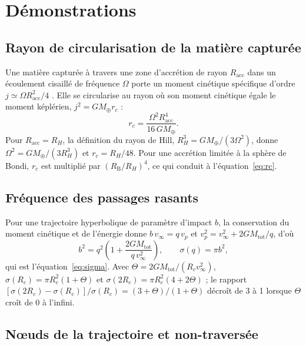 \documentclass[11pt,a4paper,openany]{report}
\newcommand{\Mt}{M_{\oplus}}
\newcommand{\Mtot}{M_{\mathrm{tot}}}
\begin{document}
\appendix

\chapter{Démonstrations}
\label{app:demo}

\section{Rayon de circularisation de la matière capturée}
\label{app:rc}

Une matière capturée à travers une zone d'accrétion de rayon $R_{\mathrm{acc}}$ dans un
écoulement cisaillé de fréquence $\Omega$ porte un moment cinétique spécifique d'ordre
$j\simeq\Omega R_{\mathrm{acc}}^2/4$ \cite{QuillenTrilling1998}. Elle se circularise au rayon où son
moment cinétique égale le moment képlérien, $j^2=G\Mt r_c$ :
\begin{equation}
r_c=\frac{\Omega^2R_{\mathrm{acc}}^4}{16\,G\Mt}.
\end{equation}
Pour $R_{\mathrm{acc}}=R_H$, la définition du rayon de Hill, $R_H^3=G\Mt/(3\Omega^2)$, donne
$\Omega^2=G\Mt/(3R_H^3)$ et $r_c=R_H/48$. Pour une accrétion limitée à la sphère de Bondi,
$r_c$ est multiplié par $(R_{\mathrm{B}}/R_H)^4$, ce qui conduit à l'équation~\eqref{eq:rc}.

\section{Fréquence des passages rasants}

Pour une trajectoire hyperbolique de paramètre d'impact $b$, la conservation du moment
cinétique et de l'énergie donne $b\,v_\infty=q\,v_p$ et $v_p^2=v_\infty^2+2G\Mtot/q$, d'où
\begin{equation}
b^2=q^2\left(1+\frac{2G\Mtot}{q\,v_\infty^2}\right),\qquad \sigma(q)=\pi b^2,
\end{equation}
qui est l'équation~\eqref{eq:sigma}. Avec $\Theta=2G\Mtot/(R_cv_\infty^2)$,
$\sigma(R_c)=\pi R_c^2(1+\Theta)$ et $\sigma(2R_c)=\pi R_c^2(4+2\Theta)$ ; le rapport
$[\sigma(2R_c)-\sigma(R_c)]/\sigma(R_c)=(3+\Theta)/(1+\Theta)$ décroît de 3 à 1 lorsque $\Theta$ croît
de 0 à l'infini.

\section{Nœuds de la trajectoire et non-traversée}
\end{document}

